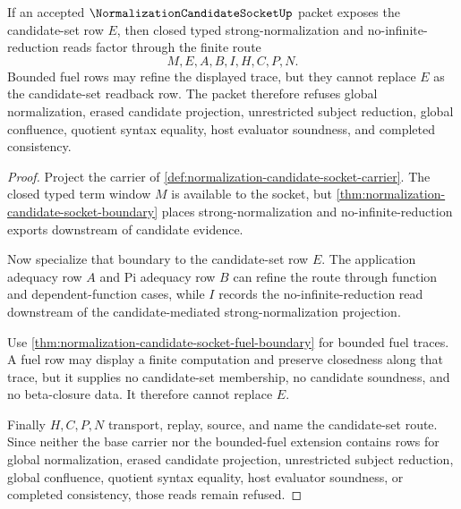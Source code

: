 \begin{theorem}
\label{thm:normalization-candidate-socket-candidate-set-readback}
If an accepted $\NormalizationCandidateSocketUp$ packet exposes the candidate-set row $E$, then closed typed strong-normalization and no-infinite-reduction reads factor through the finite route
$$
M,E,A,B,I,H,C,P,N .
$$
Bounded fuel rows may refine the displayed trace, but they cannot replace $E$ as the candidate-set readback row. The packet therefore refuses global normalization, erased candidate projection, unrestricted subject reduction, global confluence, quotient syntax equality, host evaluator soundness, and completed consistency.
\end{theorem}
\begin{proof}
Project the carrier of \autoref{def:normalization-candidate-socket-carrier}. The closed typed term window $M$ is available to the socket, but \autoref{thm:normalization-candidate-socket-boundary} places strong-normalization and no-infinite-reduction exports downstream of candidate evidence.

Now specialize that boundary to the candidate-set row $E$. The application adequacy row $A$ and Pi adequacy row $B$ can refine the route through function and dependent-function cases, while $I$ records the no-infinite-reduction read downstream of the candidate-mediated strong-normalization projection.

Use \autoref{thm:normalization-candidate-socket-fuel-boundary} for bounded fuel traces. A fuel row may display a finite computation and preserve closedness along that trace, but it supplies no candidate-set membership, no candidate soundness, and no beta-closure data. It therefore cannot replace $E$.

Finally $H,C,P,N$ transport, replay, source, and name the candidate-set route. Since neither the base carrier nor the bounded-fuel extension contains rows for global normalization, erased candidate projection, unrestricted subject reduction, global confluence, quotient syntax equality, host evaluator soundness, or completed consistency, those reads remain refused.
\end{proof}
